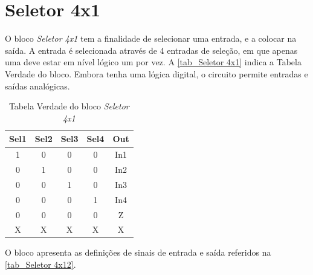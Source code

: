 \renewcommand{\NomeBloco}{\emph{Seletor 4x1}}
\renewcommand{\NomeBlocoNoIt}{Seletor 4x1}
\renewcommand{\NomePTab}{tab_\NomeBlocoNoIt}
\renewcommand{\NomeSTab}{tab_\NomeBlocoNoIt2}
\renewcommand{\NomePFig}{fig_\NomeBlocoNoIt}
\renewcommand{\NomeSFig}{fig_\NomeBlocoNoIt2}
\renewcommand{\NomeTTab}{tab_\NomeBlocoNoIt3}

\section{Seletor 4x1}

O bloco \NomeBloco{} tem a finalidade de selecionar uma entrada, e a colocar na sa\'ida. A entrada \'e selecionada atrav\'es de 4 entradas de seleção, em que apenas uma deve estar em n\'ivel l\'ogico um por vez. A \autoref{\NomePTab} indica a Tabela Verdade do bloco. Embora tenha uma l\'ogica digital, o circuito permite entradas e sa\'idas anal\'ogicas.

\begin{table}[htbp]

\caption{Tabela Verdade do bloco \NomeBloco}%
\label{\NomePTab}
\centering
\begin{tabular}{ccccc}
    \toprule
    Sel1 & Sel2 & Sel3 & Sel4 & Out \\
    \midrule \midrule
    1 & 0 & 0 & 0 & In1 \\
    \midrule
    0 & 1 & 0 & 0 & In2 \\
    \midrule
    0 & 0 & 1 & 0 & In3 \\
    \midrule
    0 & 0 & 0 & 1 & In4 \\
    \midrule
    0 & 0 & 0 & 0 & Z \\
    \midrule
    X & X & X & X & X \\
\bottomrule

\end{tabular}
\end{table}

O bloco apresenta as definições de sinais de entrada e sa\'ida referidos na \autoref{\NomeSTab}.

